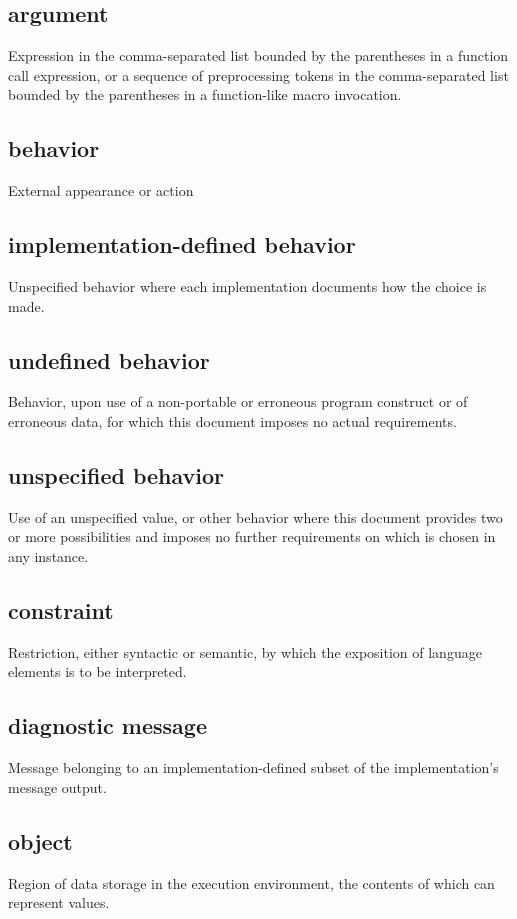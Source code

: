 \documentclass{article}
\begin{document}
\subsection*{argument}
Expression in the comma-separated list bounded by the parentheses in a function call
expression, or a sequence of preprocessing tokens in the comma-separated list bounded
by the parentheses in a function-like macro invocation.

\subsection*{behavior}
External appearance or action

\subsection*{implementation-defined behavior}
Unspecified behavior where each implementation documents how the choice is made.

\subsection*{undefined behavior}
Behavior, upon use of a non-portable or erroneous program construct or of erroneous data,
for which this document imposes no actual requirements.

\subsection*{unspecified behavior}
Use of an unspecified value, or other behavior where this document provides two or more
possibilities and imposes no further requirements on which is chosen in any instance.

\subsection*{constraint}
Restriction, either syntactic or semantic, by which the exposition of language elements
is to be interpreted.

\subsection*{diagnostic message}
Message belonging to an implementation-defined subset of the implementation's message
output.

\subsection*{object}
Region of data storage in the execution environment, the contents of which can represent
values.
\end{document}
